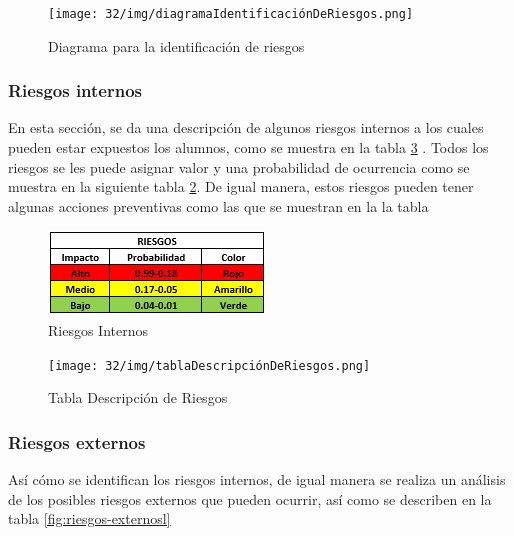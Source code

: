     \begin{figure}[H]
        \centering
        \texttt{[image: 32/img/diagramaIdentificaciónDeRiesgos.png]}
        \caption{Diagrama para la identificación de riesgos}
        \label{fig:identificacion-riesgos}
    \end{figure}
    \subsubsection{Riesgos internos}
    En esta sección, se da una descripción de algunos riesgos internos a los cuales pueden estar expuestos los alumnos, como se muestra en la tabla \ref{fig:tabla-internos} . Todos los riesgos se les puede asignar valor y una probabilidad de ocurrencia como se muestra en la siguiente tabla \ref{fig:riesgos-internos}. De igual manera, estos riesgos pueden tener algunas acciones preventivas como las que se muestran en la la tabla 

    \begin{figure}[h]
        \centering
        \includegraphics[scale=0.7]{32/img/tablaRiesgosInternos.png}
        \caption{Riesgos Internos}
        \label{fig:riesgos-internos}
    \end{figure}
    \begin{figure}[H]
        \centering
        \texttt{[image: 32/img/tablaDescripciónDeRiesgos.png]}
        \caption{Tabla Descripción de Riesgos}
        \label{fig:tabla-internos}
    \end{figure}
  
    \subsubsection{Riesgos externos}
    
    Así cómo se identifican los riesgos internos, de igual manera se realiza un análisis de los posibles riesgos externos que pueden ocurrir, así como se describen en la tabla \ref{fig:riesgos-externosl}


